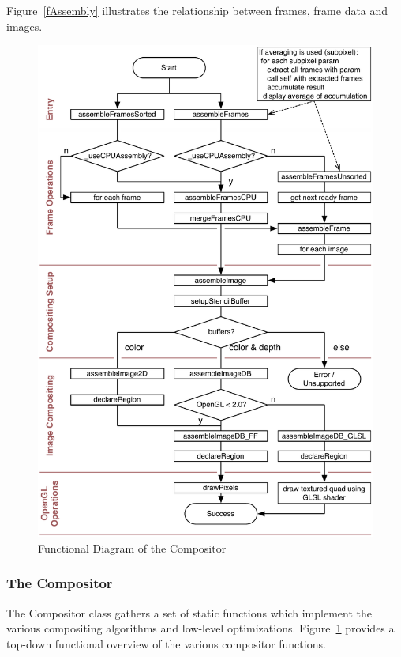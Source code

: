 \documentclass[10pt,a4]{scrartcl}
\newcommand{\fig}[1]{Figure~\ref{#1}}
\begin{document}
\fig{fAssembly} illustrates the relationship between frames, frame data
and images.

\begin{figure}[h!t]\center
  \includegraphics[width=.9\textwidth]{images/compositor.pdf}
  {\caption{\label{fCompositor}Functional Diagram of the Compositor}}
\end{figure}

\subsubsection{\label{sCompositor}The Compositor}

The \textsf{Compositor} class gathers a set of static functions which
implement the various compositing algorithms and low-level
optimizations. \fig{fCompositor} provides a top-down functional overview
of the various compositor functions.
\end{document}
